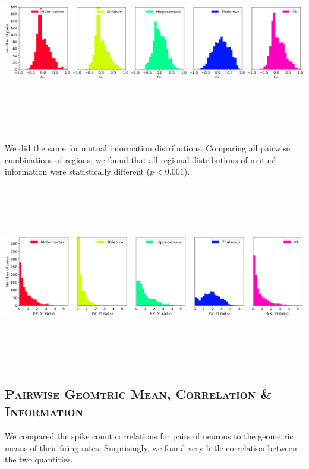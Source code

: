 \documentclass[a0,portrait]{a0poster}
\begin{document}
\begin{multicols}{2}
\includegraphics[width=\linewidth, height=8cm]{correlation_histograms.png}

We did the same for mutual information distributions. Comparing all pairwise combinations of regions, we found that all regional distributions of mutual information were statistically different ($p < 0.001$).

\includegraphics[width=\linewidth, height=8cm]{information_histograms.png}

\subsection*{\color{NavyBlue}\textsc{Pairwise Geomtric Mean, Correlation \& Information}\color{Black}}

We compared the spike count correlations for pairs of neurons to the geometric means of their firing rates. Surprisingly, we found very little correlation between the two quantities.


\end{multicols}
\end{document}

